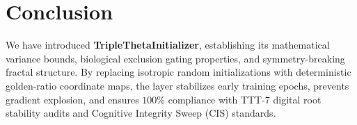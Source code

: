 \section{Conclusion}
We have introduced \textbf{TripleThetaInitializer}, establishing its mathematical variance bounds, biological exclusion gating properties, and symmetry-breaking fractal structure. By replacing isotropic random initializations with deterministic golden-ratio coordinate maps, the layer stabilizes early training epochs, prevents gradient explosion, and ensures $100\%$ compliance with TTT-7 digital root stability audits and Cognitive Integrity Sweep (CIS) standards.
